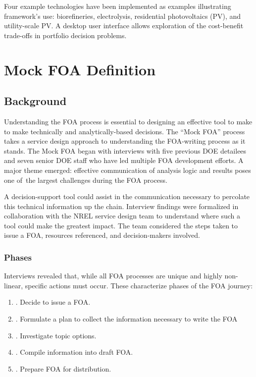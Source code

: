 \documentclass[letterpaper,10pt,english]{sphinxmanual}
\begin{document}
Four example technologies have been implemented as examples illustrating
framework’s use: biorefineries, electrolysis, residential photovoltaics
(PV), and utility-scale PV. A desktop user interface allows exploration
of the cost-benefit trade-offs in portfolio decision problems.


\section{Mock FOA Definition}
\label{\detokenize{approach:mock-foa-definition}}

\subsection{Background}
\label{\detokenize{approach:background}}
Understanding the FOA process is essential to designing an effective
tool to make to make technically and analytically-based decisions. The
“Mock FOA” process takes a service design approach to understanding the
FOA-writing process as it stands. The Mock FOA began with interviews
with five previous DOE detailees and seven senior DOE staff who have led
multiple FOA development efforts. A major theme emerged: effective
communication of analysis logic and results poses one of the largest
challenges during the FOA process.

A decision-support tool could assist in the communication necessary to
percolate this technical information up the chain. Interview findings
were formalized in collaboration with the NREL service design team to
understand where such a tool could make the greatest impact. The team
considered the steps taken to issue a FOA, resources referenced, and
decision-makers involved.


\subsubsection{Phases}
\label{\detokenize{approach:phases}}
Interviews revealed that, while all FOA processes are unique and highly
non-linear, specific actions must occur. These characterize phases of
the FOA journey:
\begin{enumerate}
\def\theenumi{\arabic{enumi}}
\def\labelenumi{\theenumi .}
\makeatletter\def\p@enumii{\p@enumi \theenumi .}\makeatother
\item {} 
. Decide to issue a FOA.

\item {} 
. Formulate a plan to collect the information necessary to write the FOA

\item {} 
. Investigate topic options.

\item {} 
. Compile information into draft FOA.

\item {} 
. Prepare FOA for distribution.

\end{enumerate}
\end{document}
